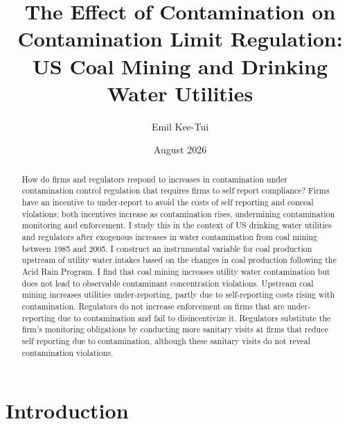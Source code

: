 \documentclass[12pt]{article}
\begin{document}
\title{The Effect of Contamination on Contamination Limit Regulation: US Coal Mining and Drinking Water Utilities}
\author{Emil Kee-Tui}
    
\date{August 2026}
\maketitle
\thispagestyle{empty}
\onehalfspacing

\begin{center}\begin{abstract}
		\noindent How do firms and regulators respond to increases in contamination under contamination control regulation that requires firms to self report compliance? Firms have an incentive to under-report to avoid the costs of self reporting and conceal violations; both incentives increase as contamination rises, undermining contamination monitoring and enforcement. I study this in the context of US drinking water utilities and regulators after exogenous increases in water contamination from coal mining between 1985 and 2005. I construct an instrumental variable for coal production upstream of utility water intakes based on the changes in coal production following the Acid Rain Program. I find that coal mining increases utility water contamination but does not lead to observable contaminant concentration violations. Upstream coal mining increases utilities under-reporting, partly due to self-reporting costs rising with contamination. Regulators do not increase enforcement on firms that are under-reporting due to contamination and fail to disincentivize it. Regulators substitute the firm's monitoring obligations by conducting more sanitary visits at firms that reduce self reporting due to contamination, although these sanitary visits do not reveal contamination violations. 
\end{abstract}\end{center}
	
\newpage
\onehalfspacing


\section{Introduction}
\end{document}
